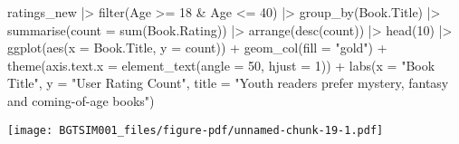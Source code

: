 \documentclass[
]{report}
\newenvironment{Shaded}{\begin{snugshade}}{\end{snugshade}}
\newcommand{\AttributeTok}[1]{\textcolor[rgb]{0.40,0.45,0.13}{#1}}
\newcommand{\DecValTok}[1]{\textcolor[rgb]{0.68,0.00,0.00}{#1}}
\newcommand{\FunctionTok}[1]{\textcolor[rgb]{0.28,0.35,0.67}{#1}}
\newcommand{\NormalTok}[1]{\textcolor[rgb]{0.00,0.23,0.31}{#1}}
\newcommand{\SpecialCharTok}[1]{\textcolor[rgb]{0.37,0.37,0.37}{#1}}
\newcommand{\StringTok}[1]{\textcolor[rgb]{0.13,0.47,0.30}{#1}}
\begin{document}
\begin{Shaded}
\begin{Highlighting}[]
\NormalTok{ratings\_new }\SpecialCharTok{|\textgreater{}}
                 \FunctionTok{filter}\NormalTok{(Age }\SpecialCharTok{\textgreater{}=} \DecValTok{18} \SpecialCharTok{\&}\NormalTok{ Age }\SpecialCharTok{\textless{}=} \DecValTok{40}\NormalTok{) }\SpecialCharTok{|\textgreater{}}
                 \FunctionTok{group\_by}\NormalTok{(Book.Title) }\SpecialCharTok{|\textgreater{}}
                 \FunctionTok{summarise}\NormalTok{(}\AttributeTok{count =} \FunctionTok{sum}\NormalTok{(Book.Rating)) }\SpecialCharTok{|\textgreater{}} 
                 \FunctionTok{arrange}\NormalTok{(}\FunctionTok{desc}\NormalTok{(count)) }\SpecialCharTok{|\textgreater{}}
                 \FunctionTok{head}\NormalTok{(}\DecValTok{10}\NormalTok{) }\SpecialCharTok{|\textgreater{}}
                 \FunctionTok{ggplot}\NormalTok{(}\FunctionTok{aes}\NormalTok{(}\AttributeTok{x =}\NormalTok{ Book.Title, }\AttributeTok{y =}\NormalTok{ count)) }\SpecialCharTok{+} 
                 \FunctionTok{geom\_col}\NormalTok{(}\AttributeTok{fill =} \StringTok{"gold"}\NormalTok{) }\SpecialCharTok{+}
                  \FunctionTok{theme}\NormalTok{(}\AttributeTok{axis.text.x =} \FunctionTok{element\_text}\NormalTok{(}\AttributeTok{angle =} \DecValTok{50}\NormalTok{, }\AttributeTok{hjust =} \DecValTok{1}\NormalTok{)) }\SpecialCharTok{+}
                  \FunctionTok{labs}\NormalTok{(}\AttributeTok{x =} \StringTok{"Book Title"}\NormalTok{, }
                       \AttributeTok{y =} \StringTok{"User Rating Count"}\NormalTok{,}
                   \AttributeTok{title =} \StringTok{"Youth readers prefer mystery, fantasy and coming{-}of{-}age books"}\NormalTok{)}
\end{Highlighting}
\end{Shaded}

\texttt{[image: BGTSIM001\_files/figure-pdf/unnamed-chunk-19-1.pdf]}
\end{document}
